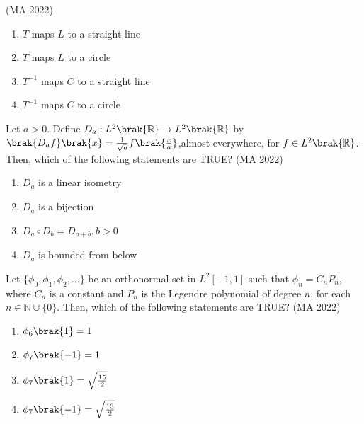 \hfill{(MA 2022)}
\begin{enumerate}
\item $T$ maps $L$ to a straight line
\item $T$ maps $L$ to a circle
\item $T^{-1}$ maps $C$ to a straight line
\item $T^{-1}$ maps $C$ to a circle
\end{enumerate}
\item Let $a>0$. Define $D_a : L^2\brak{\mathbb{R}} \rightarrow L^2\brak{\mathbb{R}}$ by $\brak{D_af}\brak{x}=\frac{1}{\sqrt{a}}f\brak{\frac{x}{a}}$,almost everywhere, for $f \in L^2\brak{\mathbb{R}}$. Then, which of the following statements are TRUE?
\hfill{(MA 2022)}
\begin{enumerate}
\item $D_a$ is a linear isometry
\item $D_a$ is a bijection
\item $D_a \circ D_b=D_{a+b},b>0$
\item $D_a$ is bounded from below
\end{enumerate}
\item Let $\{ \phi_0,\phi_1,\phi_2,\dots\}$ be an orthonormal set in $L^2[-1, 1]$ such that $\phi_n = C_nP_n$, where
$C_n$ is a constant and $P_n$ is the Legendre polynomial of degree $n$, for each $n \in \mathbb{N} \cup \{0\}$. Then, which of the following statements are TRUE?
\hfill{(MA 2022)}
\begin{multicols}{4}
\begin{enumerate}
\item $\phi_6\brak{1}=1$
\item $\phi_7\brak{-1}=1$
\item $\phi_7\brak{1}=\sqrt{\frac{15}{2}}$
\item $\phi_7\brak{-1}=\sqrt{\frac{13}{2}}$
\end{enumerate}
\end{multicols}


